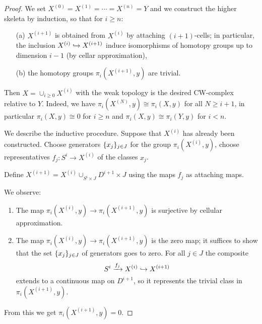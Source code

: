 \begin{proof}
We set $X^{(0)}=X^{(1)}=\cdots=X^{(n)}=Y$ and we construct the higher skeleta by induction, so that for $i\ge n$:
\begin{itemize}
    \item[(a)] $X^{(i+1)}$ is obtained from $X^{(i)}$ by attaching $(i+1)$-cells; in particular, the inclusion $X^{(i)}\hookrightarrow X^{(i+1)}$ induce isomorphisms of homotopy groups up to dimension $i-1$ (by cellar approximation),
    \item[(b)] the homotopy groups $\pi_i(X^{(i+1)},y)$ are trivial.
\end{itemize}

Then $X=\cup_{i\geq0}X^{(i)}$ with the weak topology is the desired CW-complex relative to $Y$. Indeed, we have $\pi_i(X^{(N)},y)\cong\pi_i(X,y)$ for all $N\ge i+1$, in particular $\pi_i(X,y)\cong 0$ for $i\geq n$ and $\pi_i(X,y)\cong\pi_i(Y,y)$ for $i<n$.

We describe the inductive procedure. Suppose that $X^{(i)}$ has already been constructed. Choose generators $\{x_j\}_{j\in J}$ for the group $\pi_i(X^{(i)},y)$, choose representatives $f_j:S^i\to X^{(i)}$ of the classes $x_j$.

Define $X^{(i+1)}=X^{(i)}\cup_{S^i\times J}D^{i+1}\times J$ using the maps $f_j$ as attaching maps.

We observe:
\begin{enumerate}
    \item The map $\pi_i(X^{(i)},y)\to\pi_i(X^{(i+1)},y)$ is surjective by cellular approximation.
    \item The map $\pi_i(X^{(i)},y)\to\pi_i(X^{(i+1)},y)$ is the zero map; it suffices to show that the set $\{x_j\}_{j\in J}$ of generators goes to zero. For all $j\in J$ the composite
    \[S^i\xrightarrow{f_j}X^{(i)}\hookrightarrow X^{(i+1)}\]
    extends to a continuous map on $D^{i+1}$, so it represents the trivial class in $\pi_i(X^{(i+1)},y)$.
\end{enumerate}

From this we get $\pi_i(X^{(i+1)},y)=0$.
\end{proof}
